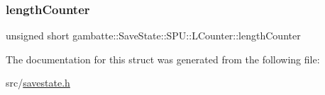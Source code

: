 \subsubsection{\texorpdfstring{length\+Counter}{lengthCounter}}
{\footnotesize\ttfamily unsigned short gambatte\+::\+Save\+State\+::\+S\+P\+U\+::\+L\+Counter\+::length\+Counter}



The documentation for this struct was generated from the following file\+:\begin{DoxyCompactItemize}
\item 
src/\hyperlink{savestate_8h}{savestate.\+h}\end{DoxyCompactItemize}
